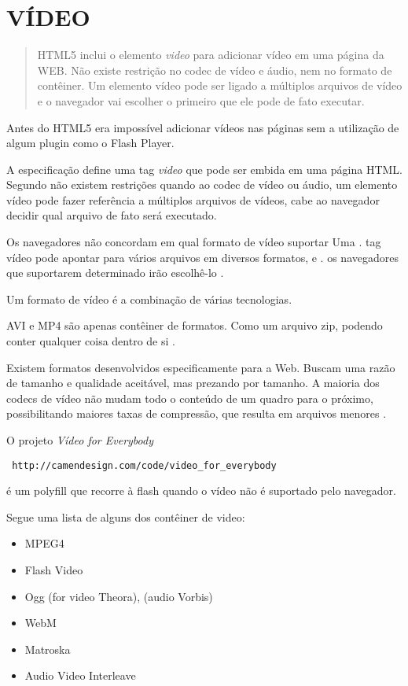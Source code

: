 \section{VÍDEO}
\begin{draft}

\cite{diveIntohtml}
\begin{quote}
HTML5 inclui o elemento \textit{video} para adicionar vídeo em uma página da WEB. Não existe restrição no codec  de vídeo e áudio, nem no formato de contêiner. Um elemento vídeo pode ser ligado a múltiplos arquivos de vídeo e o navegador vai escolher o primeiro que ele pode de fato executar.
\end{quote}


Antes do HTML5 era impossível adicionar vídeos nas páginas sem a
utilização de algum plugin como o Flash Player.

A especificação define uma tag \textit{video} que pode ser embida em
uma página HTML. Segundo \cite{diveIntohtml} não existem restrições
quando ao codec de vídeo ou áudio, um elemento vídeo pode fazer
referência a múltiplos arquivos de vídeos, cabe ao navegador decidir
qual arquivo de fato será executado.

Os navegadores não concordam em qual formato de vídeo suportar Uma   .
tag vídeo pode apontar para vários arquivos em diversos formatos, e  .
os navegadores que suportarem determinado irão escolhê-lo            .

Um formato de vídeo é a combinação de várias tecnologias.

AVI e MP4 são apenas contêiner de formatos. Como um arquivo zip,
podendo conter qualquer coisa dentro de si \autocite{diveIntohtml}.

Existem formatos desenvolvidos especificamente para a Web. Buscam uma
razão de tamanho e qualidade aceitável, mas prezando por tamanho. A
maioria dos codecs de vídeo não mudam todo o conteúdo de um quadro
para o próximo, possibilitando maiores taxas de compressão, que
resulta em arquivos menores \autocite{diveIntohtml}.

O projeto \textit{Vídeo for Everybody} \begin{verbatim} http://camendesign.com/code/video_for_everybody \end{verbatim} é um polyfill que recorre à flash quando o vídeo não é suportado pelo navegador.

Segue uma lista de alguns dos contêiner de video:
\begin{itemize}
    \item{MPEG4}
    \item{Flash Video}
    \item{Ogg} (for video Theora), (audio Vorbis)
    \item{WebM}
    \item{Matroska}
    \item{Audio Video Interleave}
\end{itemize}


\end{draft}
